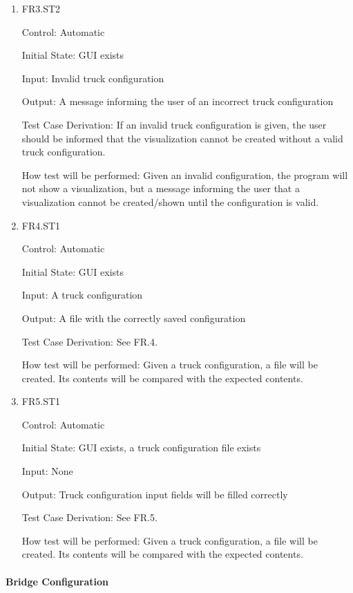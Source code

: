 \documentclass[12pt, titlepage]{article}
\begin{document}
\begin{enumerate}
  \item{FR3.ST2\\}

  Control: Automatic

  Initial State: GUI exists

  Input: Invalid truck configuration

  Output: A message informing the user of an incorrect truck configuration

  Test Case Derivation: If an invalid truck configuration is given, the user should be informed
  that the visualization cannot be created without a valid truck configuration.

  How test will be performed: Given an invalid configuration, the program will not show
  a visualization, but a message informing the user that a visualization cannot be created/shown
  until the configuration is valid.

  \item{FR4.ST1\\}

  Control: Automatic

  Initial State: GUI exists

  Input: A truck configuration

  Output: A file with the correctly saved configuration

  Test Case Derivation: See FR.4.

  How test will be performed: Given a truck configuration, a file will be created. Its contents
  will be compared with the expected contents.


  \item{FR5.ST1\\}

  Control: Automatic

  Initial State: GUI exists, a truck configuration file exists

  Input: None

  Output: Truck configuration input fields will be filled correctly

  Test Case Derivation: See FR.5.

  How test will be performed: Given a truck configuration, a file will be created. Its contents
  will be compared with the expected contents.

\end{enumerate}

\paragraph{Bridge Configuration}
\end{document}
